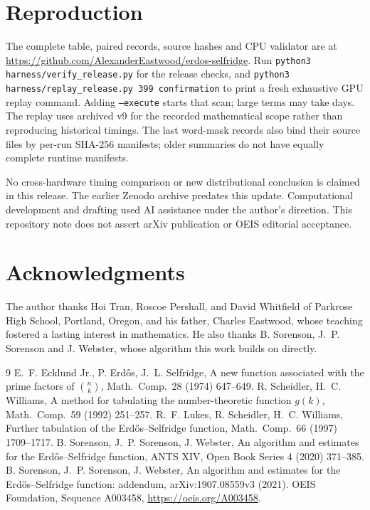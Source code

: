 \documentclass[11pt]{amsart}
\begin{document}
\section{Reproduction}
The complete table, paired records, source hashes and CPU validator are at
\url{https://github.com/AlexanderEastwood/erdos-selfridge}.
Run \texttt{python3 harness/verify\_release.py} for the release checks, and
\texttt{python3 harness/replay\_release.py 399 confirmation} to print a fresh
exhaustive GPU replay command. Adding \texttt{--execute} starts that scan; large
terms may take days. The replay uses archived v9 for the recorded mathematical
scope rather than reproducing historical timings. The last word-mask records
also bind their source files by per-run SHA-256 manifests; older summaries do
not have equally complete runtime manifests.

No cross-hardware timing comparison or new distributional conclusion is claimed
in this release. The earlier Zenodo archive predates this update. Computational
development and drafting used AI assistance under the author's direction. This
repository note does not assert arXiv publication or OEIS editorial acceptance.
\section*{Acknowledgments}
The author thanks Hoi Tran, Roscoe Pershall, and David Whitfield of Parkrose High School, Portland,
Oregon, and his father, Charles Eastwood, whose teaching fostered a lasting interest in
mathematics. He also thanks B. Sorenson, J.~P. Sorenson and J. Webster, whose algorithm this
work builds on directly.

\begin{thebibliography}{9}
 E.~F. Ecklund Jr., P. Erd\H{o}s, J.~L. Selfridge, A new function associated with the prime factors of $\binom nk$, Math.\ Comp.\ 28 (1974) 647--649.
 R. Scheidler, H.~C. Williams, A method for tabulating the number-theoretic function $g(k)$, Math.\ Comp.\ 59 (1992) 251--257.
 R.~F. Lukes, R. Scheidler, H.~C. Williams, Further tabulation of the Erd\H{o}s--Selfridge function, Math.\ Comp.\ 66 (1997) 1709--1717.
 B. Sorenson, J.~P. Sorenson, J. Webster, An algorithm and estimates for the Erd\H{o}s--Selfridge function, ANTS XIV, Open Book Series 4 (2020) 371--385.
 B. Sorenson, J.~P. Sorenson, J. Webster, An algorithm and estimates for the Erd\H{o}s--Selfridge function: addendum, arXiv:1907.08559v3 (2021).
 OEIS Foundation, Sequence A003458, \url{https://oeis.org/A003458}.
\end{thebibliography}
\end{document}
